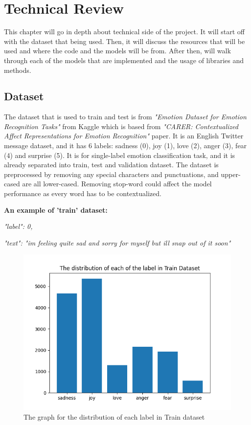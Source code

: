 
\chapter{Technical Review}

This chapter will go in depth about technical side of the project. It will start off with the dataset that being used. Then, it will discuss the resources that will be used and where the code and the models will be from. After then, will walk through each of the models that are implemented and the usage of libraries and methods.

\section{Dataset}
The dataset that is used to train and test is from \textit{"Emotion Dataset for Emotion Recognition Tasks"} \cite{Pandey_2021} from Kaggle which is based from \textit{"CARER: Contextualized Affect Representations for Emotion Recognition"} \cite{saravia-etal-2018-carer} paper. It is an English Twitter message dataset, and it has 6 labels: sadness (0), joy (1), love (2), anger (3), fear (4) and surprise (5). It is for single-label emotion classification task, and it is already separated into train, test and validation dataset. The dataset is preprocessed by removing any special characters and punctuations, and upper-cased are all lower-cased. Removing stop-word could affect the model performance as every word has to be contextualized.

\textbf{An example of 'train' dataset:} 

\emph{"label": 0,}

\textit{"text": "im feeling quite sad and sorry for myself but ill snap out of it soon" }
\begin{figure}[ht]
    \centerline{\includegraphics[scale=0.5]{Figures/dataset_distribution.png}}
    \caption{The graph for the distribution of each label in Train dataset}
    \label{fig:dataset}
\end{figure}

